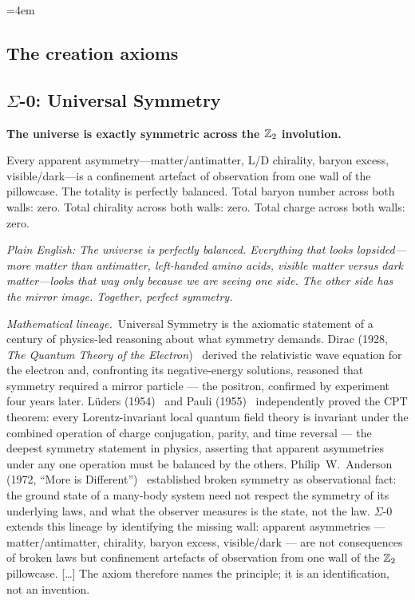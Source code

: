 \begingroup{}\emergencystretch=4em


\subsection*{The creation axioms}

\subsection*{$\Sigma$-0: Universal Symmetry}
\par\smallskip
\textbf{The universe is exactly symmetric across the $\mathbb{Z}_2$ involution.}

Every apparent asymmetry---matter/antimatter, L/D chirality, baryon excess, visible/dark---is a confinement artefact of observation from one wall of the pillowcase.  The totality is perfectly balanced.  Total baryon number across both walls: zero.  Total chirality across both walls: zero.  Total charge across both walls: zero.

\emph{Plain English: The universe is perfectly balanced.  Everything that looks lopsided---more matter than antimatter, left-handed amino acids, visible matter versus dark matter---looks that way only because we are seeing one side.  The other side has the mirror image.  Together, perfect symmetry.}

\smallskip

\noindent\emph{Mathematical lineage.}\ Universal Symmetry is the axiomatic statement of a century of physics-led reasoning about what symmetry demands.  Dirac (1928, \emph{The Quantum Theory of the Electron})~\cite{Dirac1928} derived the relativistic wave equation for the electron and, confronting its negative-energy solutions, reasoned that symmetry required a mirror particle --- the positron, confirmed by experiment four years later.  L\"{u}ders (1954)~\cite{Luders1954} and Pauli (1955)~\cite{Pauli1955} independently proved the CPT theorem: every Lorentz-invariant local quantum field theory is invariant under the combined operation of charge conjugation, parity, and time reversal --- the deepest symmetry statement in physics, asserting that apparent asymmetries under any one operation must be balanced by the others.  Philip~W.\ Anderson (1972, ``More is Different'')~\cite{Anderson1972} established broken symmetry as observational fact: the ground state of a many-body system need not respect the symmetry of its underlying laws, and what the observer measures is the state, not the law.  $\Sigma$-0 extends this lineage by identifying the missing wall: apparent asymmetries --- matter/antimatter, chirality, baryon excess, visible/dark --- are not consequences of broken laws but confinement artefacts of observation from one wall of the $\mathbb{Z}_2$ pillowcase. [\ldots]  The axiom therefore names the principle; it is an identification, not an invention.


